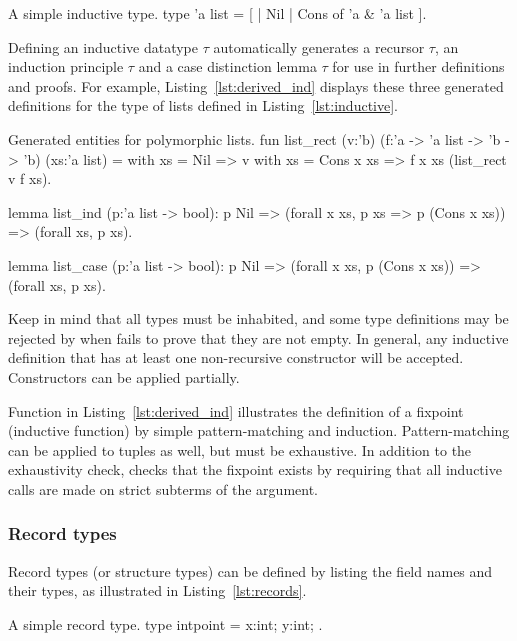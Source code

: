\begin{easycrypt}[label={lst:inductive}]{A simple inductive type.}
type 'a list = [
  | Nil
  | Cons of 'a & 'a list ].
\end{easycrypt}

Defining an inductive datatype $\tau$ automatically generates a recursor
$\tau$, an induction principle $\tau$ and a case distinction
lemma $\tau$ for use in further definitions and proofs. For example,
Listing~\ref{lst:derived_ind} displays these three generated definitions for the
type of lists defined in Listing~\ref{lst:inductive}.

\begin{easycrypt}[label={lst:derived_ind}]{Generated entities for polymorphic lists.}
fun list_rect (v:'b) (f:'a -> 'a list -> 'b -> 'b) (xs:'a list) =
  with xs = Nil        => v
  with xs = Cons x xs => f x xs (list_rect v f xs).

lemma list_ind (p:'a list -> bool):
  p Nil =>
  (forall x xs, p xs => p (Cons x xs)) =>
  (forall xs, p xs).

lemma list_case (p:'a list -> bool):
  p Nil =>
  (forall x xs, p (Cons x xs)) =>
  (forall xs, p xs).
\end{easycrypt}

Keep in mind that all types must be inhabited, and some type definitions may be
rejected by \EasyCrypt when \WhyThree fails to prove that they are not empty. In
general, any inductive definition that has at least one non-recursive
constructor will be accepted. Constructors can be applied partially.

Function  in Listing~\ref{lst:derived_ind} illustrates the
definition of a fixpoint (inductive function) by simple pattern-matching and
induction. Pattern-matching can be applied to tuples as well, but must be
exhaustive. In addition to the exhaustivity check, \WhyThree checks that the
fixpoint exists by requiring that all inductive calls are made on strict
subterms of the argument.

\subsubsection*{Record types}
Record types (or structure types) can be defined by listing the field names and
their types, as illustrated in Listing~\ref{lst:records}.

\begin{easycrypt}[label={lst:records}]{A simple record type.}
type intpoint = { x:int; y:int; }.
\end{easycrypt}

